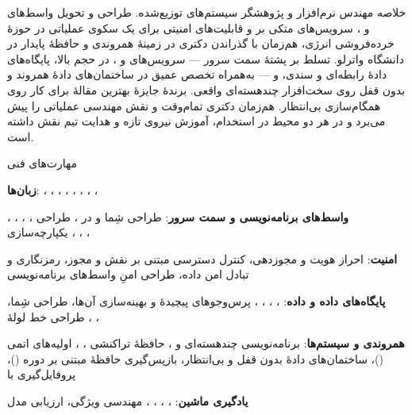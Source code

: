 \documentclass[11pt]{article}
\begin{document}

\begin{faSection}{خلاصه}
مهندس نرم‌افزار و پژوهشگر سیستم‌های توزیع‌شده. طراحی و تحویل واسط‌های  و ، سرویس‌های متکی بر  و قابلیت‌های امنیتی برای یک سکوی عملیاتی در حوزۀ خرده‌فروشی انرژی، هم‌زمان با گذراندن دکتری در زمینۀ همروندی و حافظۀ پایدار در دانشگاه واترلو. تسلط بر پشتۀ سمت سرور --- سرویس‌های  و ،  در حجم بالا، پایگاه‌های دادۀ رابطه‌ای و سندی،  و  --- به‌همراه تخصص عمیق در ساختمان‌های دادۀ همروند و بدون قفل روی سخت‌افزار چندهسته‌ای واقعی. برندۀ جایزۀ بهترین مقالۀ  برای کار روی همگام‌سازی بی‌انتظار. هم‌زمان دکتری تمام‌وقت و نقش مهندسی عملیاتی را پیش می‌برد و در هر دو محیط در استخدام، آموزش نیروی تازه و هدایت تیم نقش داشته است.
\end{faSection}

\begin{faSection}{مهارت‌های فنی}

\textbf{زبان‌ها}: ، ، ، ، ، ، ، ، 

\vspace{0.3em}
\textbf{واسط‌های برنامه‌نویسی و سمت سرور}: طراحی شِما و  در ، طراحی ، ، ، ، یکپارچه‌سازی ، ، ، 

\vspace{0.3em}
\textbf{امنیت}: احراز هویت و مجوزدهی، کنترل دسترسی مبتنی بر نقش و مجوز، رمزنگاری و تبادل امن داده، طراحی امنِ واسط‌های برنامه‌نویسی

\vspace{0.3em}
\textbf{پایگاه‌های داده و داده}: ، ، ، ، پرس‌وجوهای پیچیدۀ  و بهینه‌سازی آن‌ها، طراحی شِما، طراحی خط لولۀ ، ، 

\vspace{0.3em}
\textbf{همروندی و سیستم‌ها}: برنامه‌نویسی چندهسته‌ای و ، حافظۀ تراکنشی ، ، اولیه‌های اتمی ()، ساختمان‌های دادۀ بدون قفل و بی‌انتظار، بازپس‌گیری حافظۀ مبتنی بر دوره ()، پروفایل‌گیری با 

\vspace{0.3em}
\textbf{یادگیری ماشین}: ، ، ، ، مهندسی ویژگی، ارزیابی مدل

\end{faSection}
\end{document}
